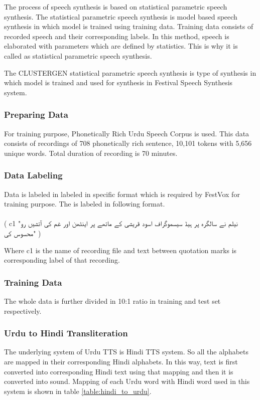 \begin{itemize}
The process of speech synthesis is based on statistical parametric speech synthesis. The statistical parametric speech synthesis is model 
based speech synthesis in which model is trained using training data. Training data consists of recorded speech and their corresponding labels. 
In this method, speech is elaborated with parameters which are defined by statistics. This is why it is called as statistical parametric speech synthesis. 

The CLUSTERGEN statistical parametric speech synthesis is type of synthesis in which model is trained and used for synthesis in 
Festival Speech Synthesis system. 

\subsubsection{Preparing Data}

For training purpose, Phonetically Rich Urdu Speech Corpus \cite{urdu_corpus} is used. This data consists of recordings of 708 phonetically rich sentence, 
10,101 tokens with 5,656 unique words. Total duration of recording is 70 minutes.

\subsubsection{Data Labeling}
Data is labeled in labeled in specific format which is required by FestVox for training purpose. The is labeled in following format.
\\ \\
( c1 "\texturdu{نیلم نے سالگرہ پر ہیڈ سیسموگراف اسود قریشی کے ماتھے پر اینٹھن اور غم کی آتشیں رو محسوس کی}" )

Where c1 is the name of recording file and text between quotation marks is corresponding label of that recording.

\subsubsection{Training Data}

The whole data is further divided in 10:1 ratio in training and test set respectively.


\subsubsection{Urdu to Hindi Transliteration}

The underlying system of Urdu TTS is Hindi TTS system. So all the alphabets are mapped in their corresponding Hindi alphabets. 
In this way, text is first converted into corresponding Hindi text using that mapping and then it is converted into sound. 
Mapping of each Urdu word with Hindi word used in this system is shown in table \ref{table:hindi_to_urdu}.


\end{itemize}
